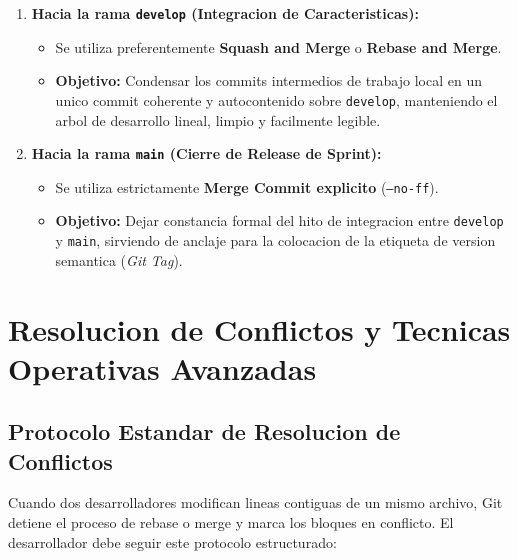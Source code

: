 \documentclass[12pt,a4paper]{report}
\begin{document}
\begin{enumerate}
  \item \textbf{Hacia la rama \texttt{develop} (Integracion de Caracteristicas):}
  \begin{itemize}
    \item Se utiliza preferentemente \textbf{Squash and Merge} o \textbf{Rebase and Merge}.
    \item \textbf{Objetivo:} Condensar los commits intermedios de trabajo local en un unico commit coherente y autocontenido sobre \texttt{develop}, manteniendo el arbol de desarrollo lineal, limpio y facilmente legible.
  \end{itemize}

  \item \textbf{Hacia la rama \texttt{main} (Cierre de Release de Sprint):}
  \begin{itemize}
    \item Se utiliza estrictamente \textbf{Merge Commit explicito} (\texttt{--no-ff}).
    \item \textbf{Objetivo:} Dejar constancia formal del hito de integracion entre \texttt{develop} y \texttt{main}, sirviendo de anclaje para la colocacion de la etiqueta de version semantica (\textit{Git Tag}).
  \end{itemize}
\end{enumerate}

\newpage
\chapter{Resolucion de Conflictos y Tecnicas Operativas Avanzadas}

\section{Protocolo Estandar de Resolucion de Conflictos}
Cuando dos desarrolladores modifican lineas contiguas de un mismo archivo, Git detiene el proceso de rebase o merge y marca los bloques en conflicto. El desarrollador debe seguir este protocolo estructurado:
\end{document}
